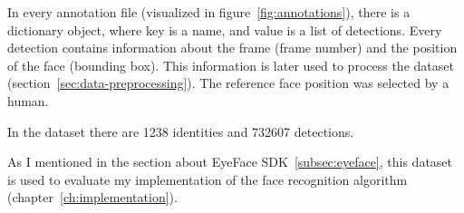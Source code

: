 In every annotation file (visualized in figure~\ref{fig:annotations}), there is a dictionary object,
where key is a name, and value is a list of detections.
Every detection contains information about the frame (frame number) and the position of the face (bounding box).
This information is later used to process the dataset (section~\ref{sec:data-preprocessing}).
The reference face position was selected by a human.

In the dataset there are 1238 identities and 732607 detections.

As I mentioned in the section about EyeFace SDK~\ref{subsec:eyeface}, this dataset is used to evaluate my
implementation of the face recognition algorithm (chapter~\ref{ch:implementation}).
